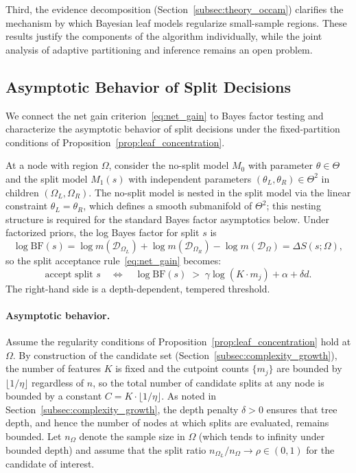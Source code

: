 \documentclass[twoside,11pt]{article}
\begin{document}
Third, the evidence decomposition (Section~\ref{subsec:theory_occam}) clarifies the mechanism by which Bayesian leaf models regularize small-sample regions. These results justify the components of the algorithm individually, while the joint analysis of adaptive partitioning and inference remains an open problem.

\subsection{Asymptotic Behavior of Split Decisions}\label{subsec:theory_split_bf}

We connect the net gain criterion~\eqref{eq:net_gain} to Bayes factor testing and characterize the asymptotic behavior of split decisions under the fixed-partition conditions of Proposition~\ref{prop:leaf_concentration}.

At a node with region $\Omega$, consider the no-split model $M_0$ with parameter $\theta \in \Theta$ and the split model $M_1(s)$ with independent parameters $(\theta_L,\theta_R) \in \Theta^2$ in children $(\Omega_L,\Omega_R)$.
The no-split model is nested in the split model via the linear constraint $\theta_L = \theta_R$, which defines a smooth submanifold of $\Theta^2$; this nesting structure is required for the standard Bayes factor asymptotics below.
Under factorized priors, the log Bayes factor for split $s$ is
\begin{equation}\label{eq:bf_local}
\log \mathrm{BF}(s)
=
\log m(\mathcal{D}_{\Omega_L}) + \log m(\mathcal{D}_{\Omega_R}) - \log m(\mathcal{D}_\Omega)
=
\Delta S(s;\Omega),
\end{equation}
so the split acceptance rule~\eqref{eq:net_gain} becomes:
\begin{equation}\label{eq:bf_threshold}
\text{accept split } s \quad \Longleftrightarrow\quad \log \mathrm{BF}(s) \;>\; \gamma\log(K \cdot m_j) + \alpha + \delta d.
\end{equation}
The right-hand side is a depth-dependent, tempered threshold.

\paragraph{Asymptotic behavior.}
Assume the regularity conditions of Proposition~\ref{prop:leaf_concentration} hold at $\Omega$. By construction of the candidate set (Section~\ref{subsec:complexity_growth}), the number of features $K$ is fixed and the cutpoint counts $\{m_j\}$ are bounded by $\lfloor 1/\eta \rfloor$ regardless of $n$, so the total number of candidate splits at any node is bounded by a constant $C = K \cdot \lfloor 1/\eta \rfloor$. As noted in Section~\ref{subsec:complexity_growth}, the depth penalty $\delta > 0$ ensures that tree depth, and hence the number of nodes at which splits are evaluated, remains bounded. Let $n_\Omega$ denote the sample size in $\Omega$ (which tends to infinity under bounded depth) and assume that the split ratio $n_{\Omega_L}/n_\Omega \to \rho \in (0,1)$ for the candidate of interest.
\end{document}
